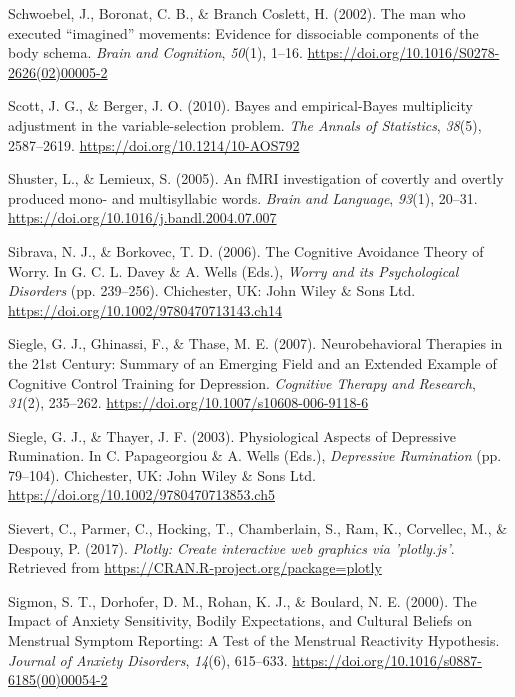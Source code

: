 \documentclass[a4paper,12pt,twoside,onecolumn,openright,final,oldfontcommands]{memoir}
\begin{document}
\leavevmode\hypertarget{ref-schwoebel_man_2002}{}%
Schwoebel, J., Boronat, C. B., \& Branch Coslett, H. (2002). The man who executed ``imagined'' movements: Evidence for dissociable components of the body schema. \emph{Brain and Cognition}, \emph{50}(1), 1--16. \url{https://doi.org/10.1016/S0278-2626(02)00005-2}

\leavevmode\hypertarget{ref-scott_bayes_2010}{}%
Scott, J. G., \& Berger, J. O. (2010). Bayes and empirical-Bayes multiplicity adjustment in the variable-selection problem. \emph{The Annals of Statistics}, \emph{38}(5), 2587--2619. \url{https://doi.org/10.1214/10-AOS792}

\leavevmode\hypertarget{ref-shuster_fmri_2005}{}%
Shuster, L., \& Lemieux, S. (2005). An fMRI investigation of covertly and overtly produced mono- and multisyllabic words. \emph{Brain and Language}, \emph{93}(1), 20--31. \url{https://doi.org/10.1016/j.bandl.2004.07.007}

\leavevmode\hypertarget{ref-davey_cognitive_2006}{}%
Sibrava, N. J., \& Borkovec, T. D. (2006). The Cognitive Avoidance Theory of Worry. In G. C. L. Davey \& A. Wells (Eds.), \emph{Worry and its Psychological Disorders} (pp. 239--256). Chichester, UK: John Wiley \& Sons Ltd. \url{https://doi.org/10.1002/9780470713143.ch14}

\leavevmode\hypertarget{ref-siegle_neurobehavioral_2007}{}%
Siegle, G. J., Ghinassi, F., \& Thase, M. E. (2007). Neurobehavioral Therapies in the 21st Century: Summary of an Emerging Field and an Extended Example of Cognitive Control Training for Depression. \emph{Cognitive Therapy and Research}, \emph{31}(2), 235--262. \url{https://doi.org/10.1007/s10608-006-9118-6}

\leavevmode\hypertarget{ref-papageorgiou_physiological_2003}{}%
Siegle, G. J., \& Thayer, J. F. (2003). Physiological Aspects of Depressive Rumination. In C. Papageorgiou \& A. Wells (Eds.), \emph{Depressive Rumination} (pp. 79--104). Chichester, UK: John Wiley \& Sons Ltd. \url{https://doi.org/10.1002/9780470713853.ch5}

\leavevmode\hypertarget{ref-R-plotly}{}%
Sievert, C., Parmer, C., Hocking, T., Chamberlain, S., Ram, K., Corvellec, M., \& Despouy, P. (2017). \emph{Plotly: Create interactive web graphics via 'plotly.js'}. Retrieved from \url{https://CRAN.R-project.org/package=plotly}

\leavevmode\hypertarget{ref-sigmon_impact_2000}{}%
Sigmon, S. T., Dorhofer, D. M., Rohan, K. J., \& Boulard, N. E. (2000). The Impact of Anxiety Sensitivity, Bodily Expectations, and Cultural Beliefs on Menstrual Symptom Reporting: A Test of the Menstrual Reactivity Hypothesis. \emph{Journal of Anxiety Disorders}, \emph{14}(6), 615--633. \url{https://doi.org/10.1016/s0887-6185(00)00054-2}
\end{document}
